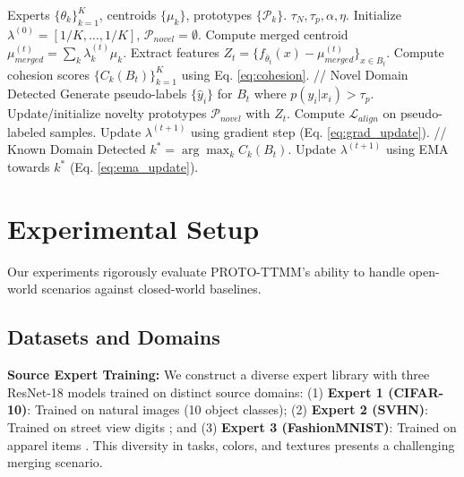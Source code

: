 \documentclass[twoside]{article}
\begin{document}
\begin{algorithm}[tb]
   \caption{PROTO-TTMM: Open-World Test-Time Merging}
   \label{alg:proto_ttmm}
\begin{algorithmic}[1]
    Experts $\{\theta_k\}_{k=1}^K$, centroids $\{\mu_k\}$, prototypes $\{\mathcal{P}_k\}$.
    $\tau_N, \tau_p, \alpha, \eta$.
   \STATE Initialize $\lambda^{(0)} = [1/K, \dots, 1/K]$, $\mathcal{P}_{novel} = \emptyset$.
   \STATE Compute merged centroid $\mu_{merged}^{(t)} = \sum_k \lambda_k^{(t)} \mu_k$.
   \STATE Extract features $Z_t = \{f_{\bar{\theta}_t}(x) - \mu_{merged}^{(t)} \}_{x \in B_t}$.
   \STATE Compute cohesion scores $\{C_k(B_t)\}_{k=1}^K$ using Eq. \ref{eq:cohesion}.
   \STATE // Novel Domain Detected
   \STATE Generate pseudo-labels $\{\hat{y}_i\}$ for $B_t$ where $p(\hat{y}_i|x_i) > \tau_p$.
   \STATE Update/initialize novelty prototypes $\mathcal{P}_{novel}$ with $Z_t$.
   \STATE Compute $\mathcal{L}_{align}$ on pseudo-labeled samples.
   \STATE Update $\lambda^{(t+1)}$ using gradient step (Eq. \ref{eq:grad_update}).
   \ELSE
   \STATE // Known Domain Detected
   \STATE $k^* = \arg\max_k C_k(B_t)$.
   \STATE Update $\lambda^{(t+1)}$ using EMA towards $k^*$ (Eq. \ref{eq:ema_update}).
   \ENDIF
   \ENDFOR
\end{algorithmic}
\end{algorithm}

\section{Experimental Setup}
\label{sec:experiments}

Our experiments rigorously evaluate PROTO-TTMM's ability to handle open-world scenarios against closed-world baselines.

\subsection{Datasets and Domains}

\textbf{Source Expert Training:} We construct a diverse expert library with three ResNet-18 models trained on distinct source domains:
(1) \textbf{Expert 1 (CIFAR-10)}: Trained on natural images \cite{krizhevsky2009learning} (10 object classes);
(2) \textbf{Expert 2 (SVHN)}: Trained on street view digits \cite{netzer2011reading}; and
(3) \textbf{Expert 3 (FashionMNIST)}: Trained on apparel items \cite{xiao2017fashion}.
This diversity in tasks, colors, and textures presents a challenging merging scenario.
\end{document}
